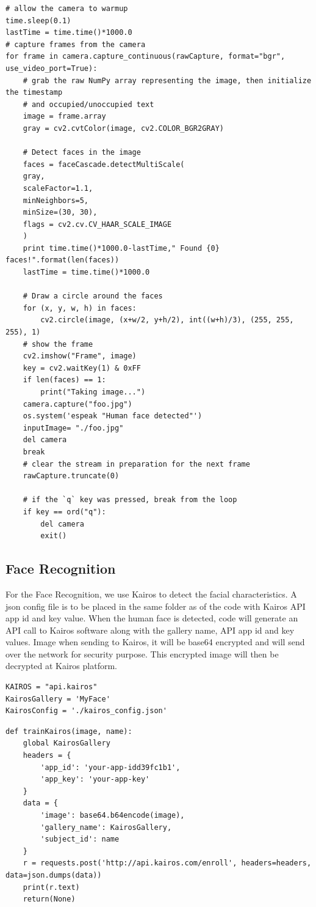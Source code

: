\documentclass[sigconf]{acmart}
\begin{document}
\begin{lstlisting}
# allow the camera to warmup
time.sleep(0.1)
lastTime = time.time()*1000.0
# capture frames from the camera
for frame in camera.capture_continuous(rawCapture, format="bgr", use_video_port=True):
	# grab the raw NumPy array representing the image, then initialize the timestamp
	# and occupied/unoccupied text
    image = frame.array
    gray = cv2.cvtColor(image, cv2.COLOR_BGR2GRAY)
    
    # Detect faces in the image
    faces = faceCascade.detectMultiScale(
    gray,
    scaleFactor=1.1,
    minNeighbors=5,
    minSize=(30, 30),
    flags = cv2.cv.CV_HAAR_SCALE_IMAGE
    )
    print time.time()*1000.0-lastTime," Found {0} faces!".format(len(faces))
    lastTime = time.time()*1000.0

    # Draw a circle around the faces
    for (x, y, w, h) in faces:
        cv2.circle(image, (x+w/2, y+h/2), int((w+h)/3), (255, 255, 255), 1)
    # show the frame
    cv2.imshow("Frame", image)
    key = cv2.waitKey(1) & 0xFF
    if len(faces) == 1:
        print("Taking image...")
	camera.capture("foo.jpg")
	os.system('espeak "Human face detected"')
	inputImage= "./foo.jpg"
	del camera
	break 
	# clear the stream in preparation for the next frame
    rawCapture.truncate(0)
    
	# if the `q` key was pressed, break from the loop
    if key == ord("q"):
        del camera
        exit()
\end{lstlisting}


\subsection{Face Recognition}
For the Face Recognition, we use Kairos to detect the facial characteristics. A json config file is to be placed in the same folder as of the code with Kairos API app id and key value. When the human face is detected, code will generate an API call to Kairos software along with the gallery name, API app id and key values. Image when sending to Kairos, it will be base64 encrypted and will send over the network for security purpose. This encrypted image will then be decrypted at Kairos platform.


\begin{lstlisting}
KAIROS = "api.kairos"
KairosGallery = 'MyFace'
KairosConfig = './kairos_config.json'
\end{lstlisting}

\begin{lstlisting}
def trainKairos(image, name):
    global KairosGallery
    headers = {
        'app_id': 'your-app-idd39fc1b1',
        'app_key': 'your-app-key'
    }
    data = {
        'image': base64.b64encode(image),
        'gallery_name': KairosGallery,
        'subject_id': name
    }
    r = requests.post('http://api.kairos.com/enroll', headers=headers, data=json.dumps(data))
    print(r.text)
    return(None)
\end{lstlisting}
\end{document}

